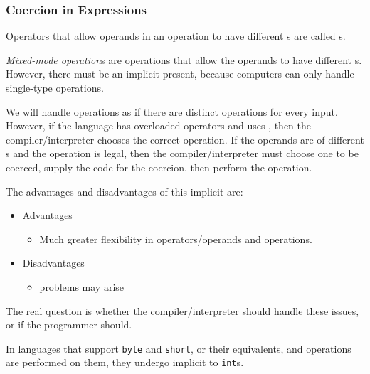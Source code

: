 \subsubsection{Coercion in Expressions}\label{subsubsec:Coercion_in_Expressions}
Operators that allow operands in an operation to have different s are called s.

\begin{definition}\label{def:Mixed_Mode_Operation}
  \emph{Mixed-mode operation}s are operations that allow the operands to have different s.
  However, there must be an implicit  present, because computers can only handle single-type operations.

  \begin{remark}\label{rmk:Relation_to_Overloaded_Operations}
    We will handle operations as if there are distinct operations for every  input.
    However, if the language has overloaded operators and uses , then the compiler/interpreter chooses the correct operation.
    If the operands are of different s and the operation is legal, then the compiler/interpreter must choose one to be coerced, supply the code for the coercion, then perform the operation.
  \end{remark}

  The advantages and disadvantages of this implicit  are:
  \begin{itemize}[noitemsep]
  \item Advantages
    \begin{itemize}[noitemsep]
    \item Much greater flexibility in operators/operands and operations.
    \end{itemize}
  \item Disadvantages
    \begin{itemize}[noitemsep]
    \item {} problems may arise
    \end{itemize}
  \end{itemize}
  The real question is whether the compiler/interpreter should handle these issues, or if the programmer should.
\end{definition}

In languages that support \texttt{byte} and \texttt{short}, or their equivalents, and operations are performed on them, they undergo implicit  to \texttt{int}s.

